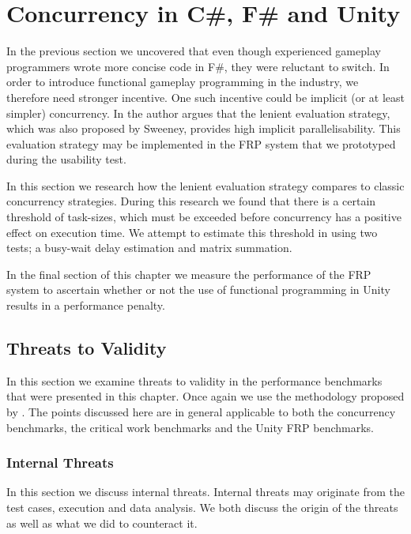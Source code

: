 \chapter{Concurrency in C\#, F\# and Unity}
In the previous section we uncovered that even though experienced gameplay programmers wrote more concise code in F\#, they were reluctant to switch. In order to introduce functional gameplay programming in the industry, we therefore need stronger incentive. One such incentive could be implicit (or at least simpler) concurrency. In \cite{DBLP:journals/cl/Tremblay-parallel} the author argues that the lenient evaluation strategy, which was also proposed by Sweeney, provides high implicit parallelisability. This evaluation strategy may be implemented in the \gls{FRP} system that we prototyped during the usability test.

In this section we research how the lenient evaluation strategy compares to classic concurrency strategies. During this research we found that there is a certain threshold of task-sizes, which must be exceeded before concurrency has a positive effect on execution time. We attempt to estimate this threshold in  using two tests; a busy-wait delay estimation and matrix summation.

In the final section of this chapter we measure the performance of the \gls{FRP} system to ascertain whether or not the use of functional programming in Unity results in a performance penalty. 





\section{Threats to Validity}
In this section we examine threats to validity in the performance benchmarks that were presented in this chapter. Once again we use the methodology proposed by \cite{mcleod:validity}. The points discussed here are in general applicable to both the concurrency benchmarks, the critical work benchmarks and the Unity \gls{FRP} benchmarks.


\subsection{Internal Threats}
In this section we discuss internal threats. Internal threats may originate from the test cases, execution and data analysis. We both discuss the origin of the threats as well as what we did to counteract it.

